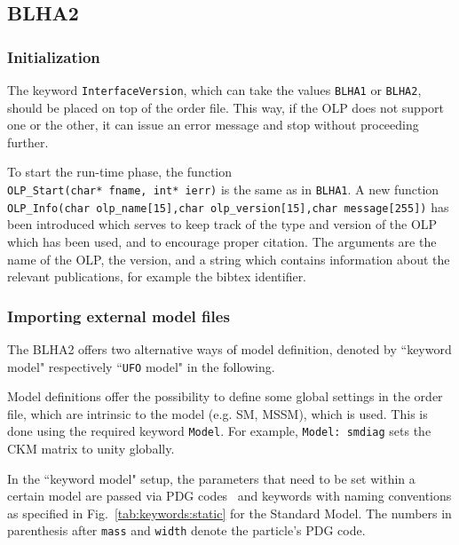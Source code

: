 \subsection{BLHA2}



\subsubsection{Initialization}
The keyword {\tt InterfaceVersion}, which can take the values
{\tt BLHA1} or {\tt BLHA2}, should be placed on top of the order file. 
This way, if the OLP does not support one or the other, it can issue an error message and stop 
without proceeding further.

To start the run-time phase, the function\\
 {\tt OLP\_Start(char* fname, int* ierr)} is the same  as in {\tt BLHA1}.
A new function\\
{\tt \small OLP\_Info(char olp\_name[15],char olp\_version[15],char message[255])} 
has been introduced
which serves to keep track of the type and version of the OLP which has been used,
and to encourage proper citation. 
The arguments are the name of the OLP, the version, and a string which  
contains information about
the relevant publications, for example the bibtex identifier.

\subsubsection{Importing external model files}

The BLHA2 offers two alternative ways of model definition, denoted by 
``keyword model" respectively ``{\tt UFO} model" in the following.

Model definitions offer the possibility to define some global settings 
in the order file, which are intrinsic to the model (e.g. SM, MSSM), which 
is used.
This is done using the required keyword {\tt Model}.
For example, {\tt Model: smdiag} sets the CKM matrix to unity globally.

In the ``keyword model" setup, 
the parameters that need to be set within a certain model 
are passed via PDG codes~\cite{Beringer:1900zz} and keywords 
with naming
conventions as specified in Fig.~\ref{tab:keywords:static} for the Standard
Model. The numbers in parenthesis after {\tt mass} and {\tt width}  denote
the particle's PDG code.

